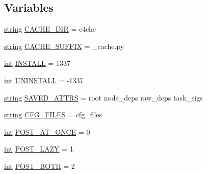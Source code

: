 \subsection*{Variables}
\begin{DoxyCompactItemize}
\item 
\hyperlink{test__lib_f_l_a_c_2format_8c_ab02026ad0de9fb6c1b4233deb0a00c75}{string} \hyperlink{namespacewaflib_1_1_build_a516d816b5ed5a46f2b18427791697eef}{C\+A\+C\+H\+E\+\_\+\+D\+IR} = \textquotesingle{}c4che\textquotesingle{}
\item 
\hyperlink{test__lib_f_l_a_c_2format_8c_ab02026ad0de9fb6c1b4233deb0a00c75}{string} \hyperlink{namespacewaflib_1_1_build_ad3ee29dba28fdd9f8d2f0da925702ece}{C\+A\+C\+H\+E\+\_\+\+S\+U\+F\+F\+IX} = \textquotesingle{}\+\_\+cache.\+py\textquotesingle{}
\item 
\hyperlink{xmltok_8h_a5a0d4a5641ce434f1d23533f2b2e6653}{int} \hyperlink{namespacewaflib_1_1_build_a429d2a6671d158d3d52690452ef16151}{I\+N\+S\+T\+A\+LL} = 1337
\item 
\hyperlink{xmltok_8h_a5a0d4a5641ce434f1d23533f2b2e6653}{int} \hyperlink{namespacewaflib_1_1_build_a76cd2aad030561e81f048830ecc53deb}{U\+N\+I\+N\+S\+T\+A\+LL} = -\/1337
\item 
\hyperlink{test__lib_f_l_a_c_2format_8c_ab02026ad0de9fb6c1b4233deb0a00c75}{string} \hyperlink{namespacewaflib_1_1_build_a4ced62ee7882805b2884b4f334cdfaf7}{S\+A\+V\+E\+D\+\_\+\+A\+T\+T\+RS} = \textquotesingle{}root node\+\_\+deps raw\+\_\+deps task\+\_\+sigs\textquotesingle{}
\item 
\hyperlink{test__lib_f_l_a_c_2format_8c_ab02026ad0de9fb6c1b4233deb0a00c75}{string} \hyperlink{namespacewaflib_1_1_build_ada90f5b2a5f081bebb0c21bf650005d3}{C\+F\+G\+\_\+\+F\+I\+L\+ES} = \textquotesingle{}cfg\+\_\+files\textquotesingle{}
\item 
\hyperlink{xmltok_8h_a5a0d4a5641ce434f1d23533f2b2e6653}{int} \hyperlink{namespacewaflib_1_1_build_ae73d35aab154a3e4b9b40d8fddc6d24d}{P\+O\+S\+T\+\_\+\+A\+T\+\_\+\+O\+N\+CE} = 0
\item 
\hyperlink{xmltok_8h_a5a0d4a5641ce434f1d23533f2b2e6653}{int} \hyperlink{namespacewaflib_1_1_build_a475148bf09bf59e2c04c062b0b1b459c}{P\+O\+S\+T\+\_\+\+L\+A\+ZY} = 1
\item 
\hyperlink{xmltok_8h_a5a0d4a5641ce434f1d23533f2b2e6653}{int} \hyperlink{namespacewaflib_1_1_build_aac9dfbb760847a87e0f2e77cf18a7332}{P\+O\+S\+T\+\_\+\+B\+O\+TH} = 2
\end{DoxyCompactItemize}


